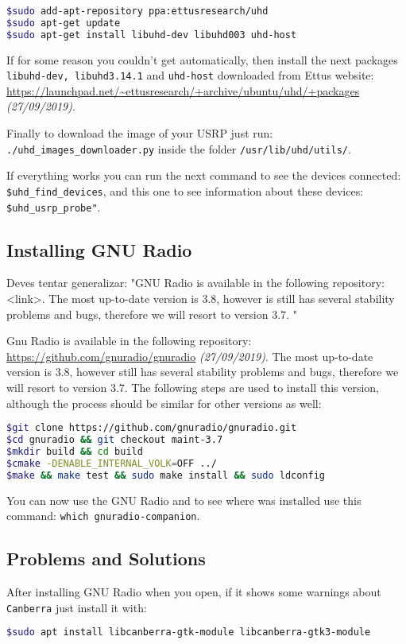 \documentclass[a4paper, 10pt, conference]{ieeeconf}      %
\begin{document}
\begin{lstlisting}[language=bash, breaklines]
$sudo add-apt-repository ppa:ettusresearch/uhd
$sudo apt-get update
$sudo apt-get install libuhd-dev libuhd003 uhd-host
\end{lstlisting}

If for some reason you couldn't get automatically, then install the next packages \verb|libuhd-dev, libuhd3.14.1| and \verb|uhd-host| downloaded from Ettus website: \url{https://launchpad.net/~ettusresearch/+archive/ubuntu/uhd/+packages} \textit{(27/09/2019)}.

Finally to download the image of your USRP just run: 
\verb|./uhd_images_downloader.py| inside the folder \verb|/usr/lib/uhd/utils/|.

If everything works you can run the next command to see the devices connected:
\verb|$uhd_find_devices|, and this one to see information about these devices: \verb|$uhd_usrp_probe"|.

\subsection{Installing GNU Radio}
Deves tentar generalizar: "GNU Radio is available in the following repository: <link>. The most up-to-date version is 3.8, however is still has several stability problems and bugs, therefore we will resort to version 3.7. "

Gnu Radio is available in the following repository: \url{https://github.com/gnuradio/gnuradio} \textit{(27/09/2019)}.  The most up-to-date version is 3.8, however still has several stability problems and bugs, therefore we will resort to version 3.7. The following steps are used to install this version, although the process should be similar for other versions as well:

\begin{lstlisting}[language=bash, breaklines]
$git clone https://github.com/gnuradio/gnuradio.git
$cd gnuradio && git checkout maint-3.7
$mkdir build && cd build
$cmake -DENABLE_INTERNAL_VOLK=OFF ../
$make && make test && sudo make install && sudo ldconfig
\end{lstlisting}

You can now use the GNU Radio and to see where was installed use this command: \verb|which gnuradio-companion|.

\subsection{Problems and Solutions}
After installing GNU Radio when you open, if it shows some warnings about \verb|Canberra| just install it with:
\begin{lstlisting}[language=bash, breaklines]
$sudo apt install libcanberra-gtk-module libcanberra-gtk3-module
\end{lstlisting}
\end{document}

